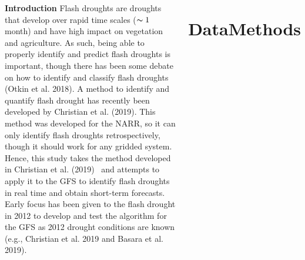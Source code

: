 \documentclass{beamer}
\begin{document}
\begin{frame}[t]{}
\begin{columns}[t]
			\begin{creambox}
				\begin{block}{\bfseries Introduction}
					\justify
					Flash droughts are droughts that develop over rapid time scales ($\thicksim 1$ month) and have high impact on vegetation and agriculture. %
					As such, being able to properly identify and predict flash droughts is important, though there has been some debate on how to identify and classify flash droughts (Otkin et al. 2018). %
					A method to identify and quantify flash drought has recently been developed by Christian et al. (2019). %
					This method was developed for the NARR, so it can only identify flash droughts retrospectively, though it should work for any gridded system. 
					Hence, this study takes the method developed in Christian et al. (2019)~%
					and attempts to apply it to the GFS to identify flash droughts in real time and obtain short-term forecasts. Early focus has been given
					to the flash drought in 2012 to develop and test the algorithm for the GFS as 2012 drought conditions are known (e.g., Christian et al. 2019 and  Basara et al. 2019).
				\end{block}
			\end{creambox}
			
			
			\section{DataMethods} %
			

\end{columns}
\end{frame}
\end{document}
